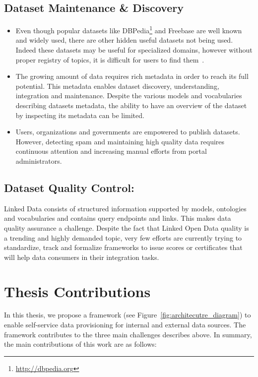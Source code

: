 \subsection{Dataset Maintenance \& Discovery}
\begin{itemize}
\item Even though popular datasets like DBPedia\footnote{\url{http://dbpedia.org}} and Freebase are well known and widely used, there are other hidden useful datasets not being used. Indeed these datasets may be useful for specialized domains, however without proper registry of topics, it is difficult for users to find them~\cite{Lalithsena:WI:13}.
\item The growing amount of data requires rich metadata in order to reach its full potential. This metadata enables dataset discovery, understanding, integration and maintenance. Despite the various models and vocabularies describing datasets metadata, the ability to have an overview of the dataset by inspecting its metadata can be limited.
\item Users, organizations and governments are empowered to publish datasets. However, detecting spam and maintaining high quality data requires continuous attention and increasing manual efforts from portal administrators.
\end{itemize}

\subsection{Dataset Quality Control:} Linked Data consists of structured information supported by models, ontologies and vocabularies and contains query endpoints and links. This makes data quality assurance a challenge. Despite the fact that Linked Open Data quality is a trending and highly demanded topic, very few efforts are currently trying to standardize, track and formalize frameworks to issue scores or certificates that will help data consumers in their integration tasks.

\section{Thesis Contributions} \label{sec:contribution}

In this thesis, we propose a framework (see Figure~\ref{fig:architecutre_diagram}) to enable self-service data provisioning for internal and external data sources. The framework contributes to the three main challenges describes above. In summary, the main
contributions of this work are as follows:

